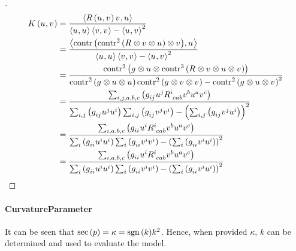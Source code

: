 \documentclass[../main.tex]{subfiles}
\begin{document}
\begin{proof}[]
    \begin{align*}
        K\left(\tensor{u}{},\tensor{v}{}\right)
        &=
        \frac{
            \inner{R\left(\tensor{u}{},\tensor{v}{}\right)\tensor{v}{}}{\tensor{u}{}}
        }{
            \inner{\tensor{u}{}}{\tensor{u}{}}
            \inner{\tensor{v}{}}{\tensor{v}{}}
            -\inner{\tensor{u}{}}{\tensor{v}{}}^2
        } \\
        &=
        \frac{
            \inner{
                \contr{\left(\contr^2{\left(\tensor{R}{}\otimes\tensor{v}{}\otimes\tensor{u}{}\right)}\otimes\tensor{v}{}\right)}
            }{\tensor{u}{}}
        }{
            \inner{\tensor{u}{}}{\tensor{u}{}}
            \inner{\tensor{v}{}}{\tensor{v}{}}
            -\inner{\tensor{u}{}}{\tensor{v}{}}^2
        } \\
        &=
        \frac{
            \contr^2{\left(\tensor{g}{}\otimes\tensor{u}{}\otimes\contr^3\left(\tensor{R}{}\otimes\tensor{v}{}\otimes\tensor{u}{}\otimes\tensor{v}{}\right)\right)}
        }{
            \contr^2{\left(\tensor{g}{}\otimes\tensor{u}{}\otimes\tensor{u}{}\right)}
            \contr^2{\left(\tensor{g}{}\otimes\tensor{v}{}\otimes\tensor{v}{}\right)}
            -\contr^2{\left(\tensor{g}{}\otimes\tensor{u}{}\otimes\tensor{v}{}\right)}^2
        } \\
        &=
        \frac{
            \sum_{i,j,a,b,c}{\left(\tensor{g}{_i_j}\tensor{u}{^j}\tensor{R}{^i_c_a_b}\tensor{v}{^b}\tensor{u}{^a}\tensor{v}{^c}\right)}
        }{
            \sum_{i,j}\left(\tensor{g}{_i_j}\tensor{u}{^j}\tensor{u}{^i}\right)
            \sum_{i,j}\left(\tensor{g}{_i_j}\tensor{v}{^j}\tensor{v}{^i}\right)
            -\left(\sum_{i,j}\left(\tensor{g}{_i_j}\tensor{v}{^j}\tensor{u}{^i}\right)\right)^2
        } \\
        &=
        \frac{
            \sum_{i,a,b,c}{\left(\tensor{g}{_i_i}\tensor{u}{^i}\tensor{R}{^i_c_a_b}\tensor{v}{^b}\tensor{u}{^a}\tensor{v}{^c}\right)}
        }{
            \sum_{i}\left(\tensor{g}{_i_i}\tensor{u}{^i}\tensor{u}{^i}\right)
            \sum_{i}\left(\tensor{g}{_i_i}\tensor{v}{^i}\tensor{v}{^i}\right)
            -\left(\sum_{i}\left(\tensor{g}{_i_i}\tensor{v}{^i}\tensor{u}{^i}\right)\right)^2
        } \\
        &=
        \frac{
            \sum_{i,a,b,c}{\left(\tensor{g}{_i_i}\tensor{u}{^i}\tensor{R}{^i_c_a_b}\tensor{v}{^b}\tensor{u}{^a}\tensor{v}{^c}\right)}
        }{
            \sum_{i}\left(\tensor{g}{_i_i}\tensor{u}{^i}\tensor{u}{^i}\right)
            \sum_{i}\left(\tensor{g}{_i_i}\tensor{v}{^i}\tensor{v}{^i}\right)
            -\left(\sum_{i}\left(\tensor{g}{_i_i}\tensor{v}{^i}\tensor{u}{^i}\right)\right)^2
        } \\
    \end{align*}
\end{proof}
\paragraph{CurvatureParameter}
It can be seen that $\operatorname{sec}\left(p\right) = \kappa = \operatorname{sgn}{\left(k\right)}k^2$.
Hence, when provided $\kappa$, $k$ can be determined and used to evaluate the model.
\end{document}
